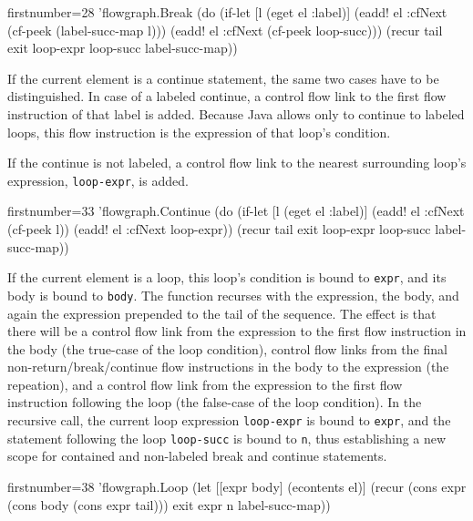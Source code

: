 \documentclass[11pt]{article}
\begin{document}
\begin{clojurecode*}{firstnumber=28}
        'flowgraph.Break
                   (do (if-let [l (eget el :label)]
                         (eadd! el :cfNext (cf-peek (label-succ-map l)))
                         (eadd! el :cfNext (cf-peek loop-succ)))
                       (recur tail exit loop-expr loop-succ label-succ-map))
\end{clojurecode*}

If the current element is a continue statement, the same two cases have to be
distinguished.  In case of a labeled continue, a control flow link to the first
flow instruction of that label is added.  Because Java allows only to continue
to labeled loops, this flow instruction is the expression of that loop's
condition.

If the continue is not labeled, a control flow link to the nearest surrounding
loop's expression, \verb|loop-expr|, is added.

\begin{clojurecode*}{firstnumber=33}
        'flowgraph.Continue
                   (do (if-let [l (eget el :label)]
                         (eadd! el :cfNext (cf-peek l))
                         (eadd! el :cfNext loop-expr))
                       (recur tail exit loop-expr loop-succ label-succ-map))
\end{clojurecode*}

If the current element is a loop, this loop's condition is bound to
\verb|expr|, and its body is bound to \verb|body|.  The function recurses with
the expression, the body, and again the expression prepended to the tail of the
sequence.  The effect is that there will be a control flow link from the
expression to the first flow instruction in the body (the true-case of the loop
condition), control flow links from the final non-return/break/continue flow
instructions in the body to the expression (the repeation), and a control flow
link from the expression to the first flow instruction following the loop (the
false-case of the loop condition).  In the recursive call, the current loop
expression \verb|loop-expr| is bound to \verb|expr|, and the statement
following the loop \verb|loop-succ| is bound to \verb|n|, thus establishing a
new scope for contained and non-labeled break and continue statements.

\begin{clojurecode*}{firstnumber=38}
        'flowgraph.Loop
                   (let [[expr body] (econtents el)]
                     (recur (cons expr (cons body (cons expr tail)))
                            exit expr n label-succ-map))
\end{clojurecode*}
\end{document}
